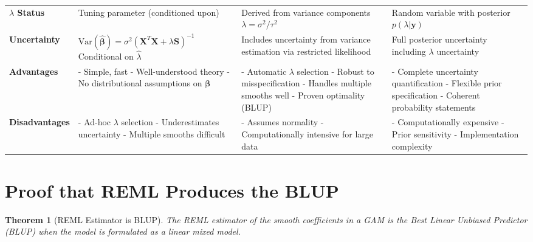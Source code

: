 \documentclass[12pt]{article}
\newtheorem{theorem}{Theorem}
\begin{document}
\begin{table}[H]
\begin{tabularx}{\textwidth}{>{\RaggedRight}p{2.5cm} >{\RaggedRight}X >{\RaggedRight}X >{\RaggedRight}X}
\textbf{$\lambda$ Status} & 
Tuning parameter (conditioned upon) & 
Derived from variance components $\lambda = \sigma^2/\tau^2$ & 
Random variable with posterior $p(\lambda|\mathbf{y})$ \\
\addlinespace

\textbf{Uncertainty} & 
$\text{Var}(\hat{\boldsymbol{\beta}}) = \sigma^2(\mathbf{X}^T\mathbf{X} + \lambda\mathbf{S})^{-1}$ \newline
Conditional on $\hat{\lambda}$ & 
Includes uncertainty from variance estimation via restricted likelihood & 
Full posterior uncertainty including $\lambda$ uncertainty \\
\addlinespace

\textbf{Advantages} & 
- Simple, fast \newline
- Well-understood theory \newline
- No distributional assumptions on $\boldsymbol{\beta}$ & 
- Automatic $\lambda$ selection \newline
- Robust to misspecification \newline
- Handles multiple smooths well \newline
- Proven optimality (BLUP) & 
- Complete uncertainty quantification \newline
- Flexible prior specification \newline
- Coherent probability statements \\
\addlinespace

\textbf{Disadvantages} & 
- Ad-hoc $\lambda$ selection \newline
- Underestimates uncertainty \newline
- Multiple smooths difficult & 
- Assumes normality \newline
- Computationally intensive for large data & 
- Computationally expensive \newline
- Prior sensitivity \newline
- Implementation complexity \\
\bottomrule
\end{tabularx}
\end{table}

\section{Proof that REML Produces the BLUP}

\begin{theorem}[REML Estimator is BLUP]
The REML estimator of the smooth coefficients in a GAM is the Best Linear Unbiased Predictor (BLUP) when the model is formulated as a linear mixed model.
\end{theorem}
\end{document}
